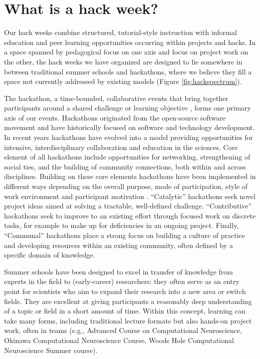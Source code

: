 \section*{What is a hack week?}

Our hack weeks combine structured, tutorial-style instruction with informal education and peer learning opportunities occurring within projects and hacks. In a space spanned by pedagogical focus on one axis and focus on project work on the other, the hack weeks we have organized are designed to lie somewhere in between traditional summer schools and hackathons, where we believe they fill a space not currently addressed by existing models (Figure \ref{fig:hackspectrum}).

The hackathon, a time-bounded, collaborative events that bring together participants around a shared challenge or learning objective \cite{Decker2015}, forms one primary axis of our events. 
Hackathons originated from the open-source software movement and have historically focused on software and technology development. 
In recent years hackathons have evolved into a model providing opportunities for intensive, interdisciplinary collaboration \cite{Groen2015-cj} and education \cite{Kienzler2015-zu,Lamers2014-xf} in the sciences. 
Core element of all hackathons include opportunities for networking, strengthening of social ties, and the building of community connections, both within and across disciplines.
Building on these core elements hackathons have been implemented in different ways depending on the overall purpose, mode of participation, style of work environment and participant motivation \cite{Drouhard2017}. 
``Catalytic'' hackathons seek novel project ideas aimed at solving a tractable, well-defined challenge.
``Contributive'' hackathons seek to improve to an existing effort through focused work on discrete tasks, for example to make up for deficiencies in an ongoing project.
Finally, ``Communal'' hackathons place a strong focus on building a culture of practice and developing resources within an existing community, often defined by a specific domain of knowledge.

Summer schools have been designed to excel in transfer of knowledge from experts in the field to (early-career) researchers: they often serve as an entry point for scientists who aim to expand their research into a new area or switch fields. They are excellent at giving participants a reasonably deep understanding of a topic or field in a short amount of time. Within this concept, learning can take many forms, including traditional lecture formats but also hands-on project work, often in teams (e.g., Advanced Course on Computational Neuroscience, Okinawa Computational Neuroscience Course, Woods Hole Computational Neuroscience Summer course). 

